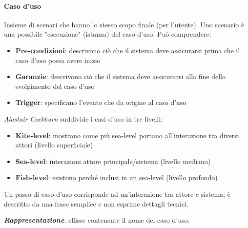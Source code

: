 \paragraph{Caso d'uso} Insieme di scenari che hanno lo stesso scopo finale (per l'utente). Uno scenario è una possibile "esecuzione" (istanza) del caso d'uso. Può comprendere:
\begin{itemize}
    \item \textbf{Pre-condizioni}: descrivono ciò che il sistema deve assicurarsi prima che il caso d'uso possa avere inizio
    \item \textbf{Garanzie}: descrivono ciò che il sistema deve assicurarsi alla fine dello svolgimento del caso d'uso
    \item \textbf{Trigger}: specificano l'evento che da origine al caso d'uso
\end{itemize}
\textit{Alastair Cockburn} suddivide i casi d'uso in tre livelli:
\begin{itemize}
    \item \textbf{Kite-level}: mostrano come più sea-level portano all'interazione tra diversi attori (livello superficiale)
    \item \textbf{Sea-level}: interazioni attore principale/sistema (livello mediano)
    \item \textbf{Fish-level}: esistono perché inclusi in un sea-level (livello profondo)
\end{itemize}
Un passo di caso d'uso corrisponde ad un'interazione tra attore e sistema; è descritto da una frase semplice e non esprime dettagli tecnici.

\textbf{\textit{Rappresentazione}}: ellisse contenente il nome del caso d'uso.

\begin{figure}[H]
  \centering
  \hfill
\end{figure}


